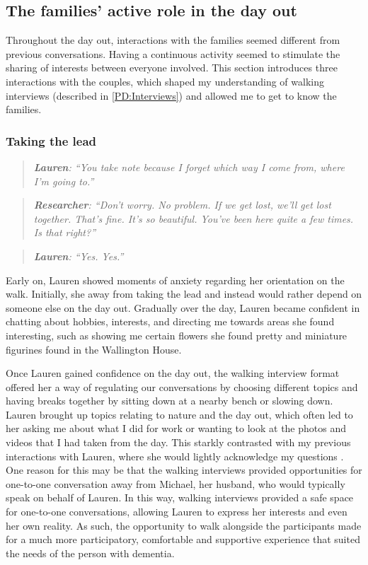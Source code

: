 \subsection{The families' active role in the day out}
\label{ActiveRole}

Throughout the day out, interactions with the families seemed different from previous conversations. Having a continuous activity seemed to stimulate the sharing of interests between everyone involved. This section introduces three interactions with the couples, which shaped my understanding of walking interviews (described in \ref{PD:Interviews}) and allowed me to get to know the families.


\subsubsection{Taking the lead}
\begin{quote}
\textit{   \textbf{Lauren}: ``You take note because I forget which way I come from, where I'm going to.''
}\end{quote}

\begin{quote}    
\textit{    \textbf{Researcher}: ``Don't worry. No problem. If we get lost, we'll get lost together. That's fine. It's so beautiful. You've been here quite a few times. Is that right?''
}    \end{quote}
    \begin{quote}    

\textit{    \textbf{Lauren}: ``Yes. Yes.''
}\end{quote}

Early on, Lauren showed moments of anxiety regarding her orientation on the walk. Initially, she  away from taking the lead and instead would rather depend on someone else on the day out. Gradually over the day, Lauren became confident in chatting about hobbies, interests, and directing me towards areas she found interesting, such as showing me certain flowers she found pretty and miniature figurines found in the Wallington House.

Once Lauren gained confidence on the day out, the walking interview format offered her a way of regulating our conversations by choosing different topics and having breaks together by sitting down at a nearby bench or slowing down. Lauren brought up topics relating to nature and the day out, which often led to her asking me about what I did for work or wanting to look at the photos and videos that I had taken from the day. This starkly contrasted with my previous interactions with Lauren, where she would lightly acknowledge my questions . One reason for this may be that the walking interviews provided opportunities for one-to-one conversation away from Michael, her husband, who would typically speak on behalf of Lauren. In this way, walking interviews provided a safe space for one-to-one conversations, allowing Lauren to express her interests and even her own reality. As such, the opportunity to walk alongside the participants made for a much more participatory, comfortable and supportive experience that suited the needs of the person with dementia.

